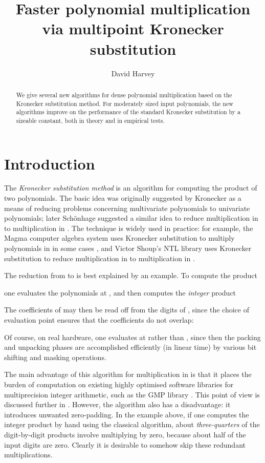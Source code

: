 \documentclass{amsart}
\theoremstyle{definition}
\theoremstyle{remark}
\begin{document}
\title[Multipoint Kronecker substitution]{Faster polynomial multiplication via multipoint Kronecker substitution}
\author{David Harvey}
\begin{abstract}
We give several new algorithms for dense polynomial multiplication based on the Kronecker substitution method. For moderately sized input polynomials, the new algorithms improve on the performance of the standard Kronecker substitution by a sizeable constant, both in theory and in empirical tests.
\end{abstract}

\maketitle

\section{Introduction}
\label{sec:intro}

The \emph{Kronecker substitution method} is an algorithm for computing the product of two polynomials. The basic idea was originally suggested by Kronecker \cite{kronecker} as a means of reducing problems concerning multivariate polynomials to univariate polynomials; later Sch\"onhage \cite{schonhage} suggested a similar idea to reduce multiplication in  to multiplication in . The technique is widely used in practice: for example, the Magma computer algebra system uses Kronecker substitution to multiply polynomials in  in some cases \cite{magma}, and Victor Shoup's NTL library \cite{ntl} uses Kronecker substitution to reduce multiplication in  to multiplication in .

The reduction from  to  is best explained by an example. To compute the product
 
one evaluates the polynomials at , and then computes the \emph{integer} product

The coefficients of  may then be read off from the digits of , since the choice of evaluation point ensures that the coefficients do not overlap:
 
Of course, on real hardware, one evaluates at  rather than , since then the packing and unpacking phases are accomplished efficiently (in linear time) by various bit shifting and masking operations.

The main advantage of this algorithm for multiplication in  is that it places the burden of computation on existing highly optimised software libraries for multiprecision integer arithmetic, such as the GMP library \cite{gmp}. This point of view is discussed further in \cite{fateman}. However, the algorithm also has a disadvantage: it introduces unwanted zero-padding. In the example above, if one computes the integer product by hand using the classical algorithm, about \emph{three-quarters} of the digit-by-digit products involve multiplying by zero, because about half of the input digits are zero. Clearly it is desirable to somehow skip these redundant multiplications.
\end{document}
